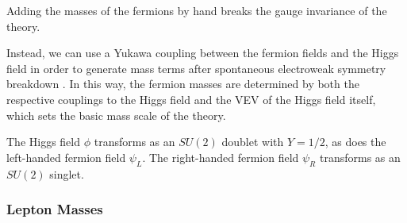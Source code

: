 Adding the masses of the fermions by hand breaks the gauge invariance of the theory.
%

%
Instead, we can use a Yukawa coupling between the fermion fields and the Higgs field in order to generate mass terms after spontaneous electroweak symmetry breakdown \cite{Weinberg:1967tq}.
In this way, the fermion masses are determined by both the respective couplings to the Higgs field and the VEV of the Higgs field itself, which sets the basic mass scale of the theory.

The Higgs field $\phi$ transforms as an $SU(2)$ doublet with $Y = 1/2$, as does the left-handed fermion field $\psi_L$.
The right-handed fermion field $\psi_R$ transforms as an $SU(2)$ singlet.

\subsubsection{Lepton Masses}


